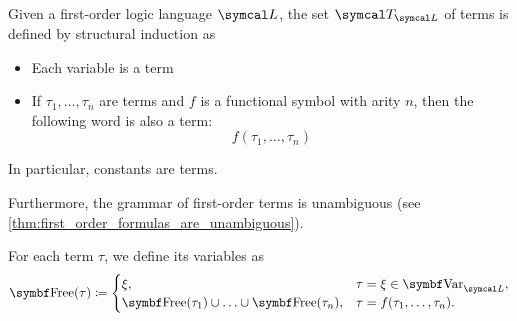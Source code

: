 \begin{definition}\label{def:first_order_term}\cite[189]{OpenLogic20201202}
  Given a first-order logic language \( \Cal{L} \), the set \( \Cal{T}_{\Cal{L}} \) of terms is defined by structural induction as
  \begin{itemize}
    \item Each variable is a term
    \item If \( \tau_1, \ldots, \tau_n \) are terms and \( f \) is a functional symbol with arity \( n \), then the following word is also a term:
    \begin{equation*}
      f(\tau_1, \ldots, \tau_n)
    \end{equation*}
  \end{itemize}

  In particular, constants are terms.

  Furthermore, the grammar of first-order terms is unambiguous (see \cref{thm:first_order_formulas_are_unambiguous}).

  For each term \( \tau \), we define its variables as
  \begin{align*}
    \Cat{Free}(\tau) \coloneqq \begin{cases}
      \xi,                                                      &\tau = \xi \in \Cat{Var}_{\Cal{L}}, \\
      \Cat{Free}(\tau_1) \cup \ldots \cup \Bold{Free}(\tau_n), &\tau = f(\tau_1, \ldots, \tau_n).
    \end{cases}
  \end{align*}
\end{definition}

